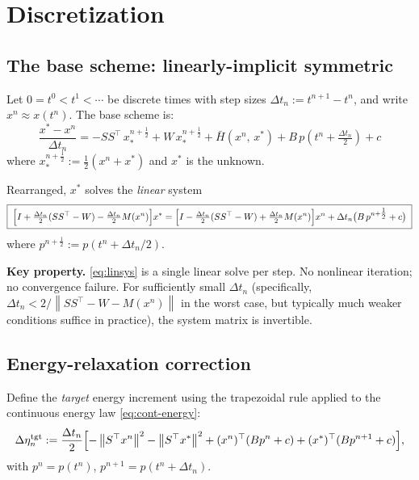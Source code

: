 \documentclass[11pt]{article}
\theoremstyle{definition}
\newcommand{\norm}[1]{\left\|#1\right\|}
\newcommand{\dt}{\Delta t}
\newcommand{\half}{\tfrac{1}{2}}
\begin{document}
\section{Discretization}

\subsection{The base scheme: linearly-implicit symmetric}

Let $0 = t^0 < t^1 < \cdots$ be discrete times with step sizes $\dt_n := t^{n+1} - t^n$, and write $x^n \approx x(t^n)$. The base scheme is:
\begin{equation}
\label{eq:base}
\boxed{\;
\frac{x^* - x^n}{\dt_n}
= -SS^\top \, x^{n+\half}_*
+ W \, x^{n+\half}_*
+ \bar H(x^n,\, x^*)
+ B\, p(t^n + \tfrac{\dt_n}{2}) + c
\;}
\end{equation}
where $x^{n+\half}_* := \tfrac{1}{2}(x^n + x^*)$ and $x^*$ is the unknown.

Rearranged, $x^*$ solves the \emph{linear} system
\begin{equation}
\label{eq:linsys}
\boxed{\;
\Bigl[I + \tfrac{\dt_n}{2}(SS^\top - W) - \tfrac{\dt_n}{2} M(x^n)\Bigr] x^*
= \Bigl[I - \tfrac{\dt_n}{2}(SS^\top - W) + \tfrac{\dt_n}{2} M(x^n)\Bigr] x^n
+ \dt_n \bigl(B\, p^{n+\half} + c\bigr)
\;}
\end{equation}
where $p^{n+\half} := p(t^n + \dt_n / 2)$.

\textbf{Key property.} \eqref{eq:linsys} is a single linear solve per step. No nonlinear iteration; no convergence failure. For sufficiently small $\dt_n$ (specifically, $\dt_n < 2 / \norm{SS^\top - W - M(x^n)}$ in the worst case, but typically much weaker conditions suffice in practice), the system matrix is invertible.

\subsection{Energy-relaxation correction}

Define the \emph{target} energy increment using the trapezoidal rule applied to the continuous energy law \eqref{eq:cont-energy}:
\begin{equation}
\label{eq:dE-true}
\Delta\eta^{\text{tgt}}_n :=
\frac{\dt_n}{2}\Bigl[
-\norm{S^\top x^n}^2 - \norm{S^\top x^*}^2
+ (x^n)^\top (B p^n + c)
+ (x^*)^\top (B p^{n+1} + c)
\Bigr],
\end{equation}
with $p^n = p(t^n)$, $p^{n+1} = p(t^n + \dt_n)$.
\end{document}

